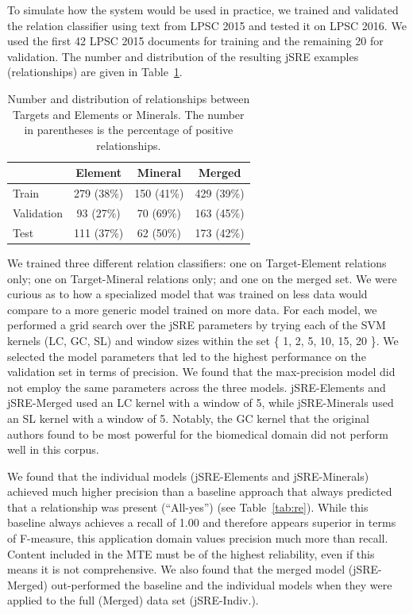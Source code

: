 \documentclass[letterpaper]{article} %
\begin{document}
To simulate how the system would be used in practice, we trained and
validated the relation classifier using text from LPSC 2015 and tested
it on LPSC 2016.  We used the first 42 LPSC 2015 documents for
training and the remaining 20 for validation.  The number and
distribution of the resulting jSRE examples (relationships) are given
in Table~\ref{tab:rels}.  

\begin{table}[b]
\caption{Number and distribution of relationships between Targets and
Elements or Minerals. The number in parentheses is the percentage of
positive relationships. }
\label{tab:rels}
\begin{center}
\begin{tabular}{l|ccc}
           & Element & Mineral & Merged \\ \hline 
Train      & 279 (38\%) & 150 (41\%) & 429 (39\%) \\
Validation &  93 (27\%) &  70 (69\%) & 163 (45\%) \\ \hline
Test       & 111 (37\%) &  62 (50\%) & 173 (42\%) \\ \hline
\end{tabular}
\end{center}
\end{table}

We trained three different relation classifiers: one on Target-Element
relations only; one on Target-Mineral relations only; and one on the
merged set.  We were curious as to how a specialized model that was
trained on less data would compare to a more generic model trained on
more data.  For each model, we performed a grid search over the jSRE
parameters by trying each of the SVM kernels (LC, GC, SL) and window
sizes within the set \{ 1, 2, 5, 10, 15, 20 \}.  We selected the model
parameters that led to the highest performance on the validation set
in terms of precision.  We found that the max-precision model did not
employ the same parameters across the three models.  jSRE-Elements and
jSRE-Merged used an LC kernel with a window of 5, while jSRE-Minerals
used an SL kernel with a window of 5.  Notably, the GC kernel that the
original authors found to be most powerful for the biomedical domain
did not perform well in this corpus.

We found that the individual models (jSRE-Elements and jSRE-Minerals)
achieved much higher precision than a baseline approach that always
predicted that a relationship was present (``All-yes'') (see
Table~\ref{tab:re}).  While this baseline always achieves a recall of
1.00 and therefore appears superior in terms of F-measure, this
application domain values precision much more than recall.  Content
included in the MTE must be of the highest reliability, even if
this means it is not comprehensive.  
%
We also found that the merged model (jSRE-Merged) out-performed the
baseline and the individual models when they were applied to the full
(Merged) data set (jSRE-Indiv.). 
\end{document}
